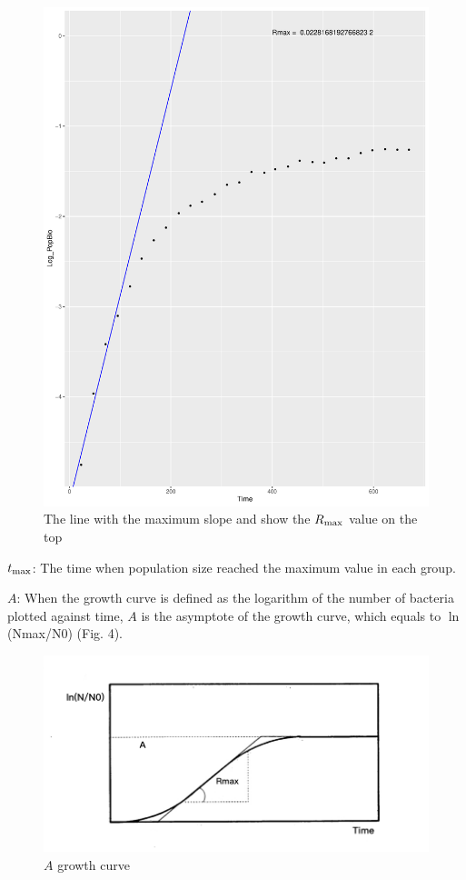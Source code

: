 \documentclass[11pt]{article}
\begin{document}
    \begin{figure}[H]
            \centering
			\includegraphics[width = \textwidth]{../results/images/Rmax_line_sample1.pdf}
            \caption{The line with the maximum slope and show the $R\textsubscript{max}$ value on the top}
            \label{fig3}
    \end{figure}
    
    $t\textsubscript{max}$: The time when population size reached the maximum value in each group.
    
    $A$: When the growth curve is defined as the logarithm of the number of bacteria plotted against time, $A$ is the asymptote of the growth curve, which equals to $\ln$ (N\textrm{max}/N\textrm{0}) (Fig. 4).
    
    \begin{figure}[H]
            \centering
			\includegraphics[width = \textwidth]{../results/images/fig4.png}
            \caption{$A$ growth curve}
            \label{fig4}
    \end{figure}
    
\end{document}
